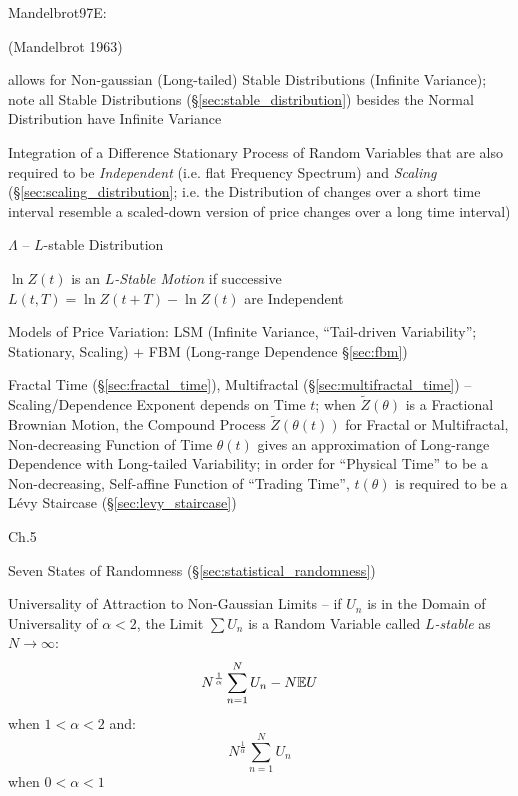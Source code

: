 
Mandelbrot97E:

(Mandelbrot 1963)

allows for Non-gaussian (Long-tailed) Stable Distributions (Infinite Variance);
note all Stable Distributions (\S\ref{sec:stable_distribution}) besides the
Normal Distribution have Infinite Variance


Integration of a Difference Stationary Process of Random Variables that are
also required to be \emph{Independent} (i.e. flat Frequency Spectrum) and
\emph{Scaling} (\S\ref{sec:scaling_distribution}; i.e. the Distribution of
changes over a short time interval resemble a scaled-down version of price
changes over a long time interval)

$\Lambda$ -- $L$-stable Distribution

$\ln Z(t)$ is an \emph{$L$-Stable Motion} if successive
$L(t, T) = \ln Z(t + T) - \ln Z(t)$ are Independent

Models of Price Variation: LSM (Infinite Variance, ``Tail-driven Variability'';
Stationary, Scaling) + FBM (Long-range Dependence \S\ref{sec:fbm})

\fist Fractal Time (\S\ref{sec:fractal_time}), Multifractal
(\S\ref{sec:multifractal_time}) -- Scaling/Dependence Exponent depends on Time
$t$; when $\tilde{Z}(\theta)$ is a Fractional Brownian Motion, the Compound
Process $\tilde{Z}(\theta(t))$ for Fractal or Multifractal, Non-decreasing
Function of Time $\theta(t)$ gives an approximation of Long-range Dependence
with Long-tailed Variability; in order for ``Physical Time'' to be a
Non-decreasing, Self-affine Function of ``Trading Time'', $t(\theta)$ is
required to be a L\'evy Staircase (\S\ref{sec:levy_staircase})

Ch.5

\fist Seven States of Randomness (\S\ref{sec:statistical_randomness})

Universality of Attraction to Non-Gaussian Limits -- if $U_n$ is in the Domain
of Universality of $\alpha < 2$, the Limit $\sum U_n$ is a Random Variable
called \emph{$L$-stable} as $N \to \infty$:
\[
  N^\frac{1}{\alpha} \sum_{n=1}^N U_n - N \mathbb{E}{U}
\]
when $1 < \alpha < 2$ and:
\[
  N^\frac{1}{\alpha} \sum_{n=1}^N U_n
\]
when $0 < \alpha < 1$

